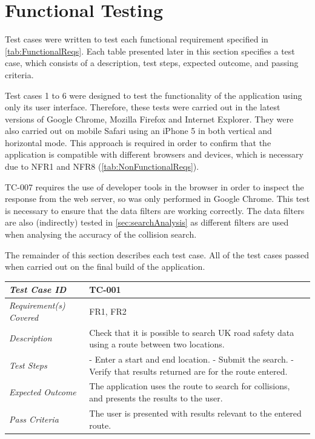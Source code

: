 \documentclass[authoryearcitations]{UoYCSproject}
\begin{document}
\section{Functional Testing}

Test cases were written to test each functional requirement specified in \autoref{tab:FunctionalReqs}. Each table presented later in this section specifies a test case, which consists of a description, test steps, expected outcome, and passing criteria.

Test cases 1 to 6 were designed to test the functionality of the application using only its user interface. Therefore, these tests were carried out in the latest versions of Google Chrome, Mozilla Firefox and Internet Explorer. They were also carried out on mobile Safari using an iPhone 5 in both vertical and horizontal mode. This approach is required in order to confirm that the application is compatible with different browsers and devices, which is necessary due to NFR1 and NFR8 (\autoref{tab:NonFunctionalReqs}).

TC-007 requires the use of developer tools in the browser in order to inspect the response from the web server, so was only performed in Google Chrome. This test is necessary to ensure that the data filters are working correctly. The data filters are also (indirectly) tested in \autoref{sec:searchAnalysis} as different filters are used when analysing the accuracy of the collision search.

The remainder of this section describes each test case. All of the test cases passed when carried out on the final build of the application.

\begin{tabular}{| p{2.5cm} | p{11cm} |}
	\hline
	\textit{Test Case ID} & TC-001 \\ \hline
	\textit{Requirement(s) Covered} & FR1, FR2 \\ \hline
	\textit{Description} & Check that it is possible to search UK road safety data using a route between two locations.  \\ \hline
	\textit{Test Steps}& - Enter a start and end location.
	\newline - Submit the search.
	\newline - Verify that results returned are for the route entered.
 \\ \hline
	\textit{Expected Outcome} & The application uses the route to search for collisions, and presents the results to the user.  \\ \hline
	\textit{Pass Criteria} & The user is presented with results relevant to the entered route.  \\ \hline
\end{tabular}
\end{document}
